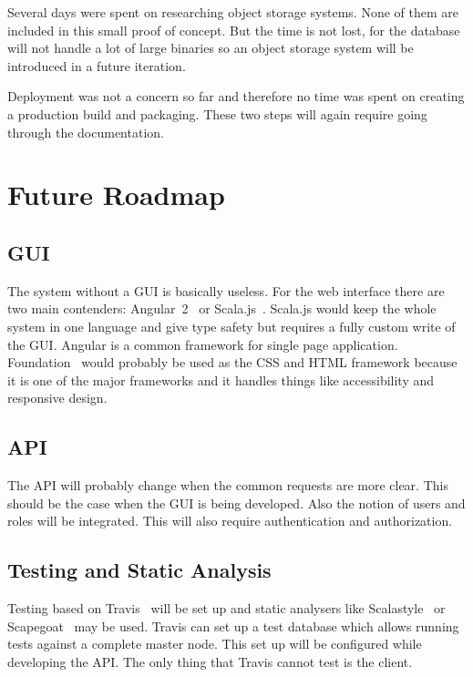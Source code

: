 \documentclass[a4paper,twocolumn,twoside]{article}
\begin{document}
Several days were spent on researching object storage systems.
None of them are included in this small proof of concept.
But the time is not lost, for the database will not handle a lot of large binaries so
an object storage system will be introduced in a future iteration.

Deployment was not a concern so far and therefore no time was spent on creating a production build and packaging.
These two steps will again require going through the documentation.



\section{Future Roadmap}

\subsection{GUI}
The system without a GUI is basically useless.
For the web interface there are two main contenders: Angular~2~\cite{Angular2} or Scala.js~\cite{ScalaJs}.
Scala.js would keep the whole system in one language and give type safety but requires a fully custom write of the GUI.
Angular is a common framework for single page application.
Foundation~\cite{Foundation} would probably be used as the CSS and HTML framework 
because it is one of the major frameworks and it handles things like accessibility and responsive design.

\subsection{API}
The API will probably change when the common requests are more clear.
This should be the case when the GUI is being developed.
Also the notion of users and roles will be integrated.
This will also require authentication and authorization.

\subsection{Testing and Static Analysis}
Testing based on Travis~\cite{Travis} will be set up and static analysers like Scalastyle~\cite{Scalastyle} or Scapegoat~\cite{Scapegoat} may be used.
Travis can set up a test database which allows running tests against a complete master node.
This set up will be configured while developing the API.
The only thing that Travis cannot test is the client.
\end{document}
